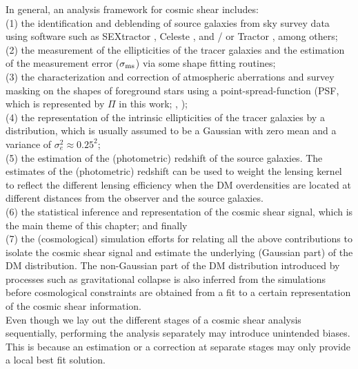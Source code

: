 In general, an analysis framework for cosmic shear includes: \\ 
(1) the identification and deblending of source galaxies from sky survey data 
using software such as {\sc SEXtractor} \citep{Bertin1996}, {\sc Celeste}
\citep{Regier2014}, and / or {\sc Tractor} \citep{Lang2010}, among others;\\
(2) the measurement of the ellipticities of the tracer galaxies  
and the estimation of the measurement error ($\sigma_{\rm
ms}$) via some shape fitting routines; \\
(3) the characterization and correction of atmospheric aberrations and survey masking 
on the shapes of foreground stars using
 a point-spread-function (PSF, which is represented by $\Pi$ in this work; \citealt{Jee2013a}, \citealt{Rowe2010}); \\
(4) the representation of the intrinsic ellipticities of the tracer galaxies by a
distribution, which is usually assumed to be a Gaussian with zero mean
and a variance of $\sigma_e^2 \approx 0.25^2$;\\ 
(5) the estimation of the (photometric) redshift of the source galaxies. The 
estimates of the (photometric) redshift can be used to weight the lensing kernel
to reflect the different lensing efficiency when the DM overdensities 
are located at different distances from the observer and the source galaxies.
\\
(6) the statistical inference and representation of the cosmic shear signal,
which is the main theme of this chapter;
and finally \\
(7) the (cosmological) simulation efforts 
for relating all the above contributions to isolate the cosmic shear signal and
estimate the underlying (Gaussian part) of the DM distribution. 
The non-Gaussian part of the DM distribution introduced by processes
such as gravitational collapse is also inferred from the simulations before    
cosmological constraints are obtained from a fit to a certain representation of
the cosmic shear information.\\ 
Even though we lay out the different stages of a cosmic shear analysis sequentially,
performing the analysis separately may introduce unintended biases. This is
because an estimation or a correction at separate stages may only provide a local
best fit solution.   

